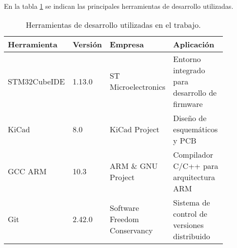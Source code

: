 En la tabla \ref{tab:herramientas} se indican las principales herramientas de desarrollo utilizadas. 


\begin{table}[htbp]
	\small
	\caption{Herramientas de desarrollo utilizadas en el trabajo.}
	\label{tab:herramientas}
	\centering
	\begin{tabular}{p{0.16\linewidth}p{0.08\linewidth}p{0.25\linewidth}p{0.4\linewidth}}
		\toprule
		\textbf{Herramienta} & \textbf{Versión} & \textbf{Empresa} & \textbf{Aplicación} \\
		\midrule
		STM32CubeIDE & 1.13.0 & ST Microelectronics & Entorno integrado para desarrollo de firmware \\
		KiCad & 8.0 & KiCad Project & Diseño de esquemáticos y PCB \\
		GCC ARM & 10.3 & ARM \& GNU Project & Compilador C/C++ para arquitectura ARM \\
		Git & 2.42.0 & Software Freedom Conservancy & Sistema de control de versiones distribuido \\
		\bottomrule
	\end{tabular}
\end{table}





